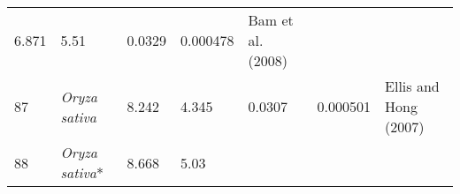 \documentclass[]{article}
\begin{document}
\begin{longtable}[]{@{}lllllll@{}}
\begin{minipage}[t]{0.05\columnwidth}
6.871\strut
\end{minipage} & \begin{minipage}[t]{0.08\columnwidth}\raggedright
5.51\strut
\end{minipage} & \begin{minipage}[t]{0.08\columnwidth}\raggedright
0.0329\strut
\end{minipage} & \begin{minipage}[t]{0.08\columnwidth}\raggedright
0.000478\strut
\end{minipage} & \begin{minipage}[t]{0.23\columnwidth}\raggedright
Bam et al. (2008)\strut
\end{minipage}\tabularnewline
\begin{minipage}[t]{0.05\columnwidth}\raggedright
87\strut
\end{minipage} & \begin{minipage}[t]{0.23\columnwidth}\raggedright
\emph{Oryza sativa}\strut
\end{minipage} & \begin{minipage}[t]{0.05\columnwidth}\raggedright
8.242\strut
\end{minipage} & \begin{minipage}[t]{0.08\columnwidth}\raggedright
4.345\strut
\end{minipage} & \begin{minipage}[t]{0.08\columnwidth}\raggedright
0.0307\strut
\end{minipage} & \begin{minipage}[t]{0.08\columnwidth}\raggedright
0.000501\strut
\end{minipage} & \begin{minipage}[t]{0.23\columnwidth}\raggedright
Ellis and Hong (2007)\strut
\end{minipage}\tabularnewline
\begin{minipage}[t]{0.05\columnwidth}\raggedright
88\strut
\end{minipage} & \begin{minipage}[t]{0.23\columnwidth}\raggedright
\emph{Oryza sativa}*\strut
\end{minipage} & \begin{minipage}[t]{0.05\columnwidth}\raggedright
8.668\strut
\end{minipage} & \begin{minipage}[t]{0.08\columnwidth}\raggedright
5.03\strut
\end{minipage} & \begin{minipage}[t]{0.08\columnwidth}\raggedright

\end{minipage}
\end{longtable}
\end{document}
